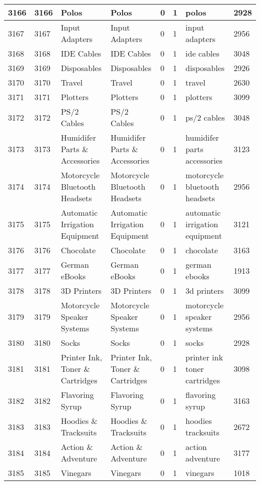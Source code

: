 \begin{longtable}{|l|l|l|l|l|l|l|l|}
3166 & 3166 & Polos & Polos & 0 & 1 & polos & 2928 \\ \hline 
3167 & 3167 & Input Adapters & Input Adapters & 0 & 1 & input adapters & 2956 \\ \hline 
3168 & 3168 & IDE Cables & IDE Cables & 0 & 1 & ide cables & 3048 \\ \hline 
3169 & 3169 & Disposables & Disposables & 0 & 1 & disposables & 2926 \\ \hline 
3170 & 3170 & Travel & Travel & 0 & 1 & travel & 2630 \\ \hline 
3171 & 3171 & Plotters & Plotters & 0 & 1 & plotters & 3099 \\ \hline 
3172 & 3172 & PS/2 Cables & PS/2 Cables & 0 & 1 & ps/2 cables & 3048 \\ \hline 
3173 & 3173 & Humidifer Parts \& Accessories & Humidifer Parts \& Accessories & 0 & 1 & humidifer parts accessories & 3123 \\ \hline 
3174 & 3174 & Motorcycle Bluetooth Headsets & Motorcycle Bluetooth Headsets & 0 & 1 & motorcycle bluetooth headsets & 2956 \\ \hline 
3175 & 3175 & Automatic Irrigation Equipment & Automatic Irrigation Equipment & 0 & 1 & automatic irrigation equipment & 3121 \\ \hline 
3176 & 3176 & Chocolate & Chocolate & 0 & 1 & chocolate & 3163 \\ \hline 
3177 & 3177 & German eBooks & German eBooks & 0 & 1 & german ebooks & 1913 \\ \hline 
3178 & 3178 & 3D Printers & 3D Printers & 0 & 1 & 3d printers & 3099 \\ \hline 
3179 & 3179 & Motorcycle Speaker Systems & Motorcycle Speaker Systems & 0 & 1 & motorcycle speaker systems & 2956 \\ \hline 
3180 & 3180 & Socks & Socks & 0 & 1 & socks & 2928 \\ \hline 
3181 & 3181 & Printer Ink, Toner \& Cartridges & Printer Ink, Toner \& Cartridges & 0 & 1 & printer ink toner cartridges & 3098 \\ \hline 
3182 & 3182 & Flavoring Syrup & Flavoring Syrup & 0 & 1 & flavoring syrup & 3163 \\ \hline 
3183 & 3183 & Hoodies \& Tracksuits & Hoodies \& Tracksuits & 0 & 1 & hoodies tracksuits & 2672 \\ \hline 
3184 & 3184 & Action \& Adventure & Action \& Adventure & 0 & 1 & action adventure & 3177 \\ \hline 
3185 & 3185 & Vinegars & Vinegars & 0 & 1 & vinegars & 1018 \\ \hline 

\end{longtable}
